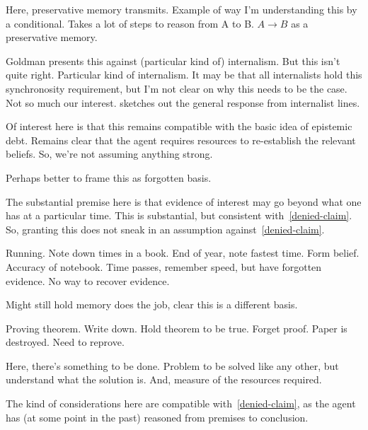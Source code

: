 \begin{note}
  Here, preservative memory transmits.
  Example of way I'm understanding this by a conditional.
  Takes a lot of steps to reason from A to B.
  \(A \rightarrow B\) as a preservative memory.

  Goldman presents this against (particular kind of) internalism.
  But this isn't quite right.
  Particular kind of internalism.
  It may be that all internalists hold this synchronosity requirement, but I'm not clear on why this needs to be the case.
  Not so much our interest.
  \cite{Korcz:2019tl} sketches out the general response from internalist lines.

  Of interest here is that this remains compatible with the basic idea of epistemic debt.
  Remains clear that the agent requires resources to re-establish the relevant beliefs.
  So, we're not assuming anything strong.

  Perhaps better to frame this as forgotten basis.
\end{note}

\begin{note}
  The substantial premise here is that evidence of interest may go beyond what one has at a particular time.
  This is substantial, but consistent with~\ref{denied-claim}.
  So, granting this does not sneak in an assumption against~\ref{denied-claim}.
\end{note}

\begin{note}
  Running.
  Note down times in a book.
  End of year, note fastest time.
  Form belief.
  Accuracy of notebook.
  Time passes, remember speed, but have forgotten evidence.
  No way to recover evidence.

  Might still hold memory does the job, clear this is a different basis.
\end{note}

\begin{note}
  Proving theorem.
  Write down.
  Hold theorem to be true.
  Forget proof.
  Paper is destroyed.
  Need to reprove.

  Here, there's something to be done.
  Problem to be solved like any other, but understand what the solution is.
  And, measure of the resources required.
\end{note}

\begin{note}[~\ref{denied-claim}]
  The kind of considerations here are compatible with~\ref{denied-claim}, as the agent has (at some point in the past) reasoned from premises to conclusion.
\end{note}

